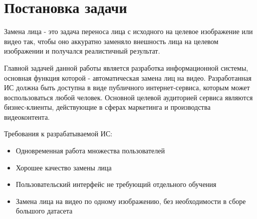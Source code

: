\section{Постановка задачи}

Замена лица - это задача переноса лица с исходного на целевое изображение или видео так, чтобы оно аккуратно заменяло внешность лица на целевом изображении и получался реалистичный результат\cite[стр. 1]{nirkin2019fsgan}.

Главной задачей данной работы является разработка информационной системы, основная функция которой - автоматическая замена лиц на видео. Разработанная ИС должна быть доступна в виде публичного интернет-сервиса, которым может воспользоваться любой человек.
Основной целевой аудиторией сервиса являются бизнес-клиенты, действующие в сферах маркетинга и производства видеоконтента.

Требования к разрабатываемой ИС:

\begin{itemize}
    \item Одновременная работа множества пользователей
    \item Хорошее качество замены лица
    \item Пользовательский интерфейс не требующий отдельного обучения
    \item Замена лица на видео по одному изображению, без необходимости в сборе большого датасета
\end{itemize}